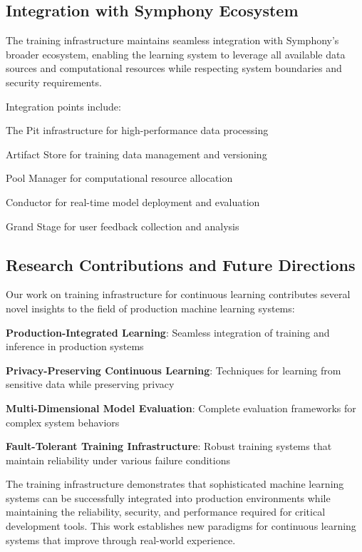 \subsection*{Integration with Symphony Ecosystem}

The training infrastructure maintains seamless integration with Symphony's broader ecosystem, enabling the learning system to leverage all available data sources and computational resources while respecting system boundaries and security requirements.

Integration points include:

\begin{compactlist}
    \item The Pit infrastructure for high-performance data processing
    \item Artifact Store for training data management and versioning
    \item Pool Manager for computational resource allocation
    \item Conductor for real-time model deployment and evaluation
    \item Grand Stage for user feedback collection and analysis
\end{compactlist}

\subsection*{Research Contributions and Future Directions}

Our work on training infrastructure for continuous learning contributes several novel insights to the field of production machine learning systems:

\begin{expandedlist}
    \item \textbf{Production-Integrated Learning}: Seamless integration of training and inference in production systems
    \item \textbf{Privacy-Preserving Continuous Learning}: Techniques for learning from sensitive data while preserving privacy
    \item \textbf{Multi-Dimensional Model Evaluation}: Complete evaluation frameworks for complex system behaviors
    \item \textbf{Fault-Tolerant Training Infrastructure}: Robust training systems that maintain reliability under various failure conditions
\end{expandedlist}

The training infrastructure demonstrates that sophisticated machine learning systems can be successfully integrated into production environments while maintaining the reliability, security, and performance required for critical development tools. This work establishes new paradigms for continuous learning systems that improve through real-world experience.
